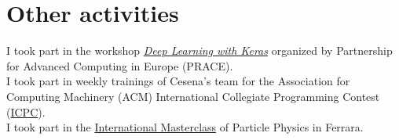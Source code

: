 \documentclass[curriculum-vitae-eng]{subfiles}
\begin{document}
	\section*{Other activities}
		 I took part in the workshop \href{https://prace-indico.niif.hu/event/1336/overview}{\textit{Deep Learning with Keras}} organized by Partnership for Advanced Computing in Europe (PRACE).\\
	
		 I took part in weekly trainings of Cesena's team for the Association for Computing Machinery (ACM) International Collegiate Programming Contest (\href{https://icpc.global}{ICPC}).\\
		
		 I took part in the \href{https://physicsmasterclasses.org}{International Masterclass} of Particle Physics in Ferrara.
	
\end{document}
